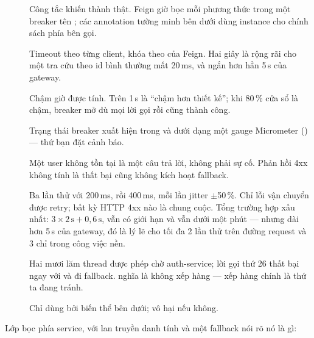 \begin{description}
  \item[] Công tắc khiến  thành thật. Feign
  giờ bọc mỗi phương thức trong một breaker tên
  ; các annotation tường
  minh bên dưới dùng instance  cho chính sách phía
  bên gọi.
  \item[] Timeout theo từng client, khóa theo  của
  Feign. Hai giây là rộng rãi cho một tra cứu theo id bình thường mất
  20\,ms, và ngắn hơn hẳn 5\,s của gateway.
  \item[] Chậm giờ được tính. Trên 1\,s là ``chậm hơn thiết kế'';
  khi 80\,\% cửa sổ là chậm, breaker mở dù mọi lời gọi rồi cũng thành
  công.
  \item[] Trạng thái breaker xuất hiện trong
   và dưới dạng một gauge Micrometer
  () --- thứ bạn đặt cảnh báo.
  \item[] Một user không tồn tại là một câu trả lời, không phải
  sự cố. Phản hồi 4xx không tính là thất bại cũng không kích hoạt
  fallback.
  \item[] Ba lần thử với 200\,ms, rồi 400\,ms, mỗi lần jitter
  $\pm$50\,\%. Chỉ lỗi vận chuyển được retry; bất kỳ HTTP 4xx nào là
  chung cuộc. Tổng trường hợp xấu nhất:
  $3 \times 2\,\text{s} + 0{,}6\,\text{s}$, vẫn có giới hạn và vẫn dưới
  một phút --- nhưng dài hơn 5\,s của gateway, đó là lý lẽ cho tối đa 2
  lần thử trên đường request và 3 chỉ trong công việc nền.
  \item[] Hai mươi lăm thread được phép chờ auth-service; lời gọi
  thứ 26 thất bại ngay với  và đi
  fallback.  nghĩa là không xếp hàng --- xếp
  hàng chính là thứ ta đang tránh.
  \item[] Chỉ dùng bởi biến thể  bên
  dưới; vô hại nếu không.
\end{description}

Lớp bọc phía service, với lan truyền danh tính và một fallback nói rõ
nó là gì:

